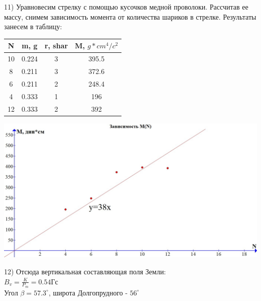 \documentclass[a4paper,12pt]{article} %
\begin{document}
11) Уравновесим стрелку с помощью кусочков медной проволоки. Рассчитав ее массу, снимем зависимость момента от количества шариков в стрелке. Результаты занесем в таблицу: \\
\begin{center}

\begin{tabular}{|c|c|c|c|}

\hline 
N & m, g & r, shar & M, $g*cm^4/c^2$ \\ 
\hline 
10 & 0.224 & 3 & 395.5 \\ 
\hline 
8 & 0.211 & 3 & 372.6 \\ 
\hline 
6 & 0.211 & 2 & 248.4 \\ 
\hline 
4 & 0.333 & 1 & 196 \\ 
\hline 
12 & 0.333 & 2 & 392 \\ 
\hline 
\end{tabular} 
\end{center}


\includegraphics[scale=0.34]{1222}

12) Отсюда вертикальная составляющая поля Земли: \\ $B_v=\frac{K}{P_m}=0.54$Гс\\


Угол $\beta=57.3^{\circ}$, широта Долгопрудного - $56^{\circ}$
\end{document}

